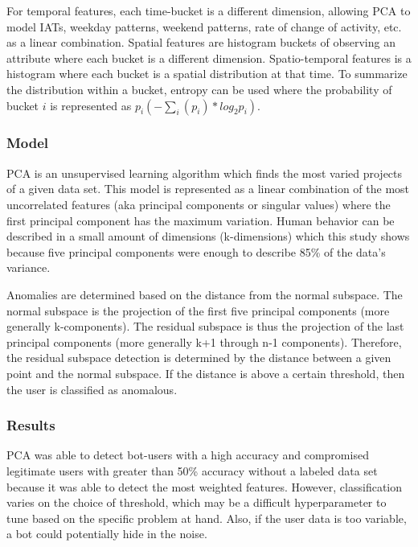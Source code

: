 \documentclass[11pt, oneside]{article}   	%
\begin{document}
\quad For temporal features, each time-bucket is a different dimension, allowing PCA to model IATs, weekday patterns, weekend patterns, rate of change of activity, etc. as a linear combination.
Spatial features are histogram buckets of observing an attribute where each bucket is a different dimension.
Spatio-temporal features is a histogram where each bucket is a spatial distribution at that time.
To summarize the distribution within a bucket, entropy can be used where the probability of bucket $i$ is represented as $p_i (- \sum_i (p_i) * log_2 p_i)$.

\subsubsection*{Model}

\quad PCA is an unsupervised learning algorithm which finds the most varied projects of a given data set.
This model is represented as a linear combination of the most uncorrelated features (aka principal components or singular values) where the first principal component has the maximum variation.
Human behavior can be described in a small amount of dimensions (k-dimensions) which this study shows because five principal components were enough to describe 85\% of the data's variance.

\quad Anomalies are determined based on the distance from the normal subspace.
The normal subspace is the projection of the first five principal components (more generally k-components).
The residual subspace is thus the projection of the last principal components (more generally k+1 through n-1 components).
Therefore, the residual subspace detection is determined by the distance between a given point and the normal subspace.
If the distance is above a certain threshold, then the user is classified as anomalous.

\subsubsection*{Results}

\quad PCA was able to detect bot-users with a high accuracy and compromised legitimate users with greater than 50\% accuracy without a labeled data set because it was able to detect the most weighted features.
However, classification varies on the choice of threshold, which may be a difficult hyperparameter to tune based on the specific problem at hand.
Also, if the user data is too variable, a bot could potentially hide in the noise.
\end{document}
